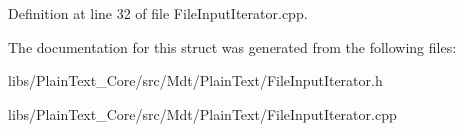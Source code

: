 Definition at line 32 of file File\+Input\+Iterator.\+cpp.



The documentation for this struct was generated from the following files\+:\begin{DoxyCompactItemize}
\item 
libs/\+Plain\+Text\+\_\+\+Core/src/\+Mdt/\+Plain\+Text/File\+Input\+Iterator.\+h\item 
libs/\+Plain\+Text\+\_\+\+Core/src/\+Mdt/\+Plain\+Text/File\+Input\+Iterator.\+cpp\end{DoxyCompactItemize}
